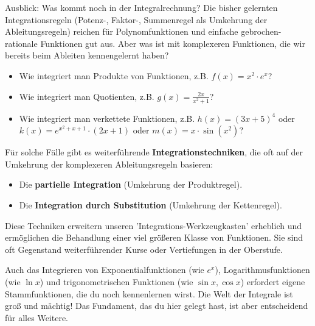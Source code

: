 \begin{infoboxumgebung}{Ausblick: Was kommt noch in der Integralrechnung?}
Die bisher gelernten Integrationsregeln (Potenz-, Faktor-, Summenregel als Umkehrung der Ableitungsregeln) reichen für Polynomfunktionen und einfache gebrochen-rationale Funktionen gut aus. Aber was ist mit komplexeren Funktionen, die wir bereits beim Ableiten kennengelernt haben?
\begin{itemize}
    \item Wie integriert man Produkte von Funktionen, z.B. $f(x) = x^2 \cdot e^x$?
    \item Wie integriert man Quotienten, z.B. $g(x) = \frac{2x}{x^2+1}$?
    \item Wie integriert man verkettete Funktionen, z.B. $h(x) = (3x+5)^4$ oder $k(x) = e^{x^2+x+1} \cdot (2x+1)$ oder $m(x) = x \cdot \sin(x^2)$?
\end{itemize}
Für solche Fälle gibt es weiterführende \textbf{Integrationstechniken}, die oft auf der Umkehrung der komplexeren Ableitungsregeln basieren:
\begin{itemize}
    \item Die \textbf{partielle Integration} (Umkehrung der Produktregel).
    \item Die \textbf{Integration durch Substitution} (Umkehrung der Kettenregel).
\end{itemize}
Diese Techniken erweitern unseren 'Integrations-Werkzeugkasten' erheblich und ermöglichen die Behandlung einer viel größeren Klasse von Funktionen. Sie sind oft Gegenstand weiterführender Kurse oder Vertiefungen in der Oberstufe.

Auch das Integrieren von Exponentialfunktionen (wie $e^x$), Logarithmusfunktionen (wie $\ln x$) und trigonometrischen Funktionen (wie $\sin x, \cos x$) erfordert eigene Stammfunktionen, die du noch kennenlernen wirst. Die Welt der Integrale ist groß und mächtig! Das Fundament, das du hier gelegt hast, ist aber entscheidend für alles Weitere.
\end{infoboxumgebung}



